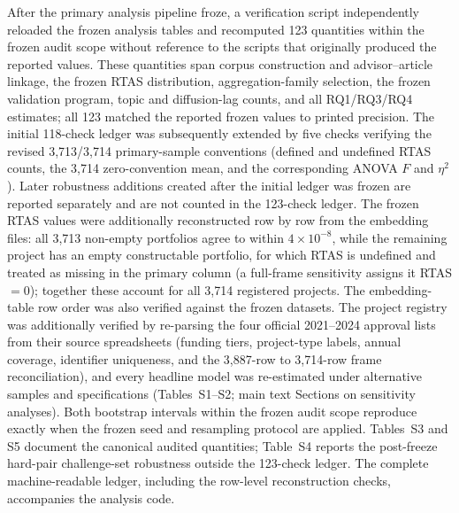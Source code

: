 After the primary analysis pipeline froze, a verification script independently reloaded the frozen analysis tables and recomputed 123 quantities within the frozen audit scope without reference to the scripts that originally produced the reported values. These quantities span corpus construction and advisor--article linkage, the frozen RTAS distribution, aggregation-family selection, the frozen validation program, topic and diffusion-lag counts, and all RQ1/RQ3/RQ4 estimates; all 123 matched the reported frozen values to printed precision. The initial 118-check ledger was subsequently extended by five checks verifying the revised 3,713/3,714 primary-sample conventions (defined and undefined RTAS counts, the 3,714 zero-convention mean, and the corresponding ANOVA $F$ and $\eta^2$). Later robustness additions created after the initial ledger was frozen are reported separately and are not counted in the 123-check ledger. The frozen RTAS values were additionally reconstructed row by row from the embedding files: all 3,713 non-empty portfolios agree to within $4\times10^{-8}$, while the remaining project has an empty constructable portfolio, for which RTAS is undefined and treated as missing in the primary column (a full-frame sensitivity assigns it RTAS $=0$); together these account for all 3,714 registered projects. The embedding-table row order was also verified against the frozen datasets. The project registry was additionally verified by re-parsing the four official 2021--2024 approval lists from their source spreadsheets (funding tiers, project-type labels, annual coverage, identifier uniqueness, and the 3,887-row to 3,714-row frame reconciliation), and every headline model was re-estimated under alternative samples and specifications (Tables~S1--S2; main text Sections on sensitivity analyses). Both bootstrap intervals within the frozen audit scope reproduce exactly when the frozen seed and resampling protocol are applied. Tables~S3 and S5 document the canonical audited quantities; Table~S4 reports the post-freeze hard-pair challenge-set robustness outside the 123-check ledger. The complete machine-readable ledger, including the row-level reconstruction checks, accompanies the analysis code.


